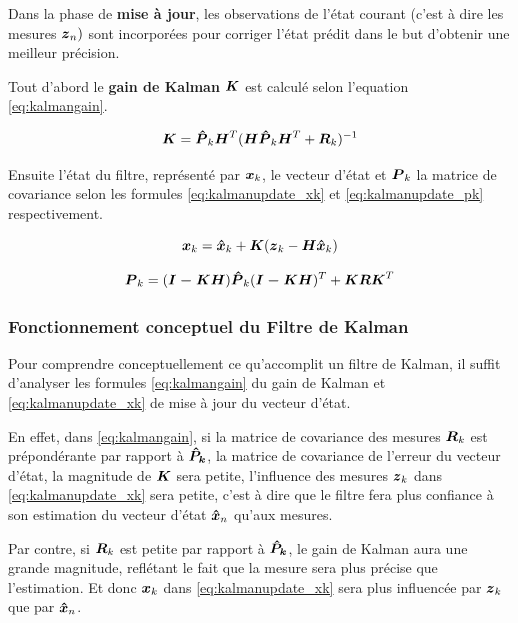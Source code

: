 \documentclass[12pt,a4paper]{report}
\begin{document}
	
	
	\para Dans la phase de \textbf{mise à jour}, les observations de l'état courant (c'est à dire les mesures $\boldsymbol{z}_n)$ sont incorporées pour corriger l'état prédit dans le but d'obtenir une meilleur précision.
	
	\para Tout d'abord le \textbf{gain de Kalman} $\boldsymbol{K}$ est calculé selon l'equation \ref{eq:kalmangain}.
	
	\begin{equation}
	\label{eq:kalmangain}
	\boldsymbol{K} = \boldsymbol{\hat{P}}_k \boldsymbol{H}^T (\boldsymbol{H} \boldsymbol{\hat{P}}_k \boldsymbol{H}^T + \boldsymbol{R}_k ) ^{-1}
	\end{equation}
	
	
	\para Ensuite l'état du filtre, représenté par $\boldsymbol{x}_k$, le vecteur d'état et $\boldsymbol{P}_k$ la matrice de covariance selon les formules \ref{eq:kalmanupdate_xk} et \ref{eq:kalmanupdate_pk} respectivement.
	
	\begin{equation}
	\label{eq:kalmanupdate_xk}
	\boldsymbol{x}_k = \boldsymbol{\hat{x}}_k + \boldsymbol{K} (\boldsymbol{z}_k - \boldsymbol{H \hat{x}}_k)
	\end{equation}
	
	\begin{equation}
	\label{eq:kalmanupdate_pk}
	\boldsymbol{P}_k = (\boldsymbol{I-KH})\boldsymbol{\hat{P}}_k(\boldsymbol{I-KH})^T + \boldsymbol{KRK}^T
	\end{equation}


	\subsubsection{Fonctionnement conceptuel du Filtre de Kalman}
	Pour comprendre conceptuellement ce qu'accomplit un filtre de Kalman, il suffit d'analyser les formules \ref{eq:kalmangain} du gain de Kalman et \ref{eq:kalmanupdate_xk} de mise à jour du vecteur d'état.
	
	\para En effet, dans \ref{eq:kalmangain}, si la matrice de covariance des mesures $\boldsymbol{R}_k$ est prépondérante par rapport à $\boldsymbol{\hat{P}_k}$, la matrice de covariance de l'erreur du vecteur d'état, la magnitude de $\boldsymbol{K}$ sera petite, l'influence des mesures $\boldsymbol{z}_k$ dans \ref{eq:kalmanupdate_xk} sera petite, c'est à dire que le filtre fera plus confiance à son estimation du vecteur d'état $\boldsymbol{\hat{x}}_n$ qu'aux mesures.
	
	\para Par contre, si $\boldsymbol{R}_k$ est petite par rapport à $\boldsymbol{\hat{P}_k}$, le gain de Kalman aura une grande magnitude, reflétant le fait que la mesure sera plus précise que l'estimation. Et donc $\boldsymbol{x}_k$ dans \ref{eq:kalmanupdate_xk} sera plus influencée par $\boldsymbol{z}_k$ que par $\boldsymbol{\hat{x}}_n$.
	
\end{document}
